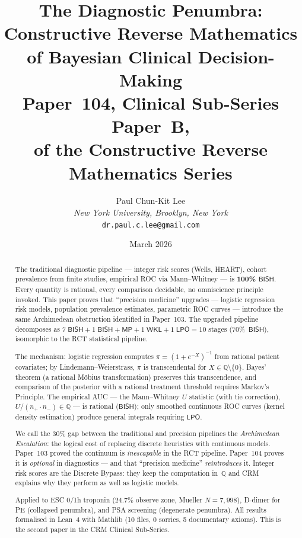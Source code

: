 \documentclass[11pt,a4paper]{article}
\theoremstyle{plain}
\theoremstyle{definition}
\newcommand{\BISH}{\textsf{BISH}}
\newcommand{\WKL}{\textsf{WKL}}
\newcommand{\LPO}{\textsf{LPO}}
\newcommand{\MP}{\textsf{MP}}
\newcommand{\Q}{\mathbb{Q}}
\begin{document}
\title{\textbf{The Diagnostic Penumbra:\\
Constructive Reverse Mathematics of Bayesian Clinical Decision-Making}\\[6pt]
\large Paper~104, Clinical Sub-Series Paper~B,\\
of the Constructive Reverse Mathematics Series}

\author{Paul Chun-Kit Lee\\
\textit{New York University, Brooklyn, New York}\\
\texttt{dr.paul.c.lee@gmail.com}}

\date{March 2026}
\maketitle

\begin{abstract}
The traditional diagnostic pipeline --- integer risk scores (Wells, HEART), cohort prevalence from finite studies, empirical ROC via Mann--Whitney --- is \textbf{100\% $\BISH$}.  Every quantity is rational, every comparison decidable, no omniscience principle invoked.  This paper proves that ``precision medicine'' upgrades --- logistic regression risk models, population prevalence estimates, parametric ROC curves --- introduce the same Archimedean obstruction identified in Paper~103.  The upgraded pipeline decomposes as $7\;\BISH + 1\;\BISH{+}\MP + 1\;\WKL + 1\;\LPO = 10$ stages (70\%~$\BISH$), isomorphic to the RCT statistical pipeline.

The mechanism: logistic regression computes $\pi = (1 + e^{-X})^{-1}$ from rational patient covariates; by Lindemann--Weierstrass, $\pi$ is transcendental for $X \in \Q \setminus \{0\}$.  Bayes' theorem (a rational M\"obius transformation) preserves this transcendence, and comparison of the posterior with a rational treatment threshold requires Markov's Principle.  The empirical AUC --- the Mann--Whitney $U$ statistic (with tie correction), $U/(n_+ \cdot n_-) \in \Q$ --- is rational ($\BISH$); only smoothed continuous ROC curves (kernel density estimation) produce general integrals requiring $\LPO$.

We call the 30\% gap between the traditional and precision pipelines the \emph{Archimedean Escalation}: the logical cost of replacing discrete heuristics with continuous models.  Paper~103 proved the continuum is \emph{inescapable} in the RCT pipeline.  Paper~104 proves it is \emph{optional} in diagnostics --- and that ``precision medicine'' \emph{reintroduces} it.  Integer risk scores are the Discrete Bypass: they keep the computation in~$\Q$ and CRM explains why they perform as well as logistic models.

Applied to ESC 0/1h troponin (24.7\% observe zone, Mueller $N = 7{,}998$), D-dimer for PE (collapsed penumbra), and PSA screening (degenerate penumbra).  All results formalised in Lean~4 with Mathlib (10 files, 0 sorries, 5 documentary axioms).  This is the second paper in the CRM Clinical Sub-Series.
\end{abstract}
\end{document}
